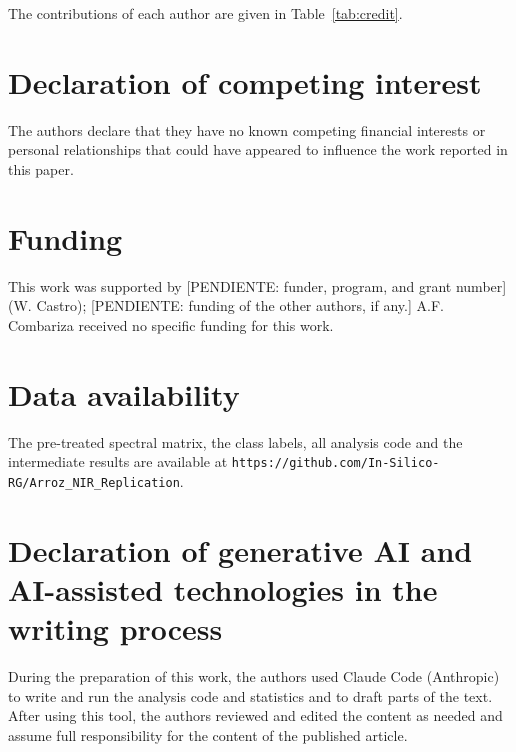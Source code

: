 \documentclass[final,5p,times,twocolumn]{elsarticle}
\begin{document}
The contributions of each author are given in Table~\ref{tab:credit}.

\section*{Declaration of competing interest}
The authors declare that they have no known competing financial interests or personal relationships that could have appeared to influence the work reported in this paper.

\section*{Funding}
This work was supported by [PENDIENTE: funder, program, and grant number] (W. Castro); [PENDIENTE: funding of the other authors, if any.] A.F. Combariza received no specific funding for this work.

\section*{Data availability}
The pre-treated spectral matrix, the class labels, all analysis code and the intermediate results are available at \texttt{https://github.com/\allowbreak In-Silico-RG/\allowbreak Arroz\_NIR\_Replication}.

\section*{Declaration of generative AI and AI-assisted technologies in the writing process}
During the preparation of this work, the authors used Claude Code (Anthropic) to write and run the analysis code and statistics and to draft parts of the text. After using this tool, the authors reviewed and edited the content as needed and assume full responsibility for the content of the published article.



\end{document}
